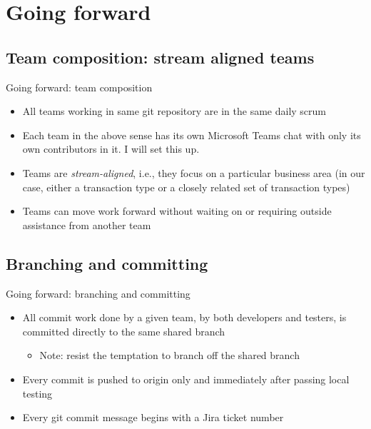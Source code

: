 \documentclass{beamer}
\begin{document}
	\section{Going forward}
	\subsection{Team composition: stream aligned teams}
	\begin{frame}{Going forward: team composition}
		\begin{itemize}
			\item All teams working in same git repository are in the same daily scrum \pause
			\item Each team in the above sense has its own Microsoft Teams chat with only its own contributors in it. I will set this up. \pause
			\item Teams are \textit{stream-aligned}, i.e., they focus on a particular business area (in our case, either a transaction type or a closely related set of transaction types) \pause
			\item Teams can move work forward without waiting on or requiring outside assistance from another team \pause	
		\end{itemize}
	\end{frame}
	\subsection{Branching and committing}
	\begin{frame}{Going forward: branching and committing}
		\begin{itemize}
			\item All commit work done by a given team, by both developers and testers, is committed directly to the same shared branch \pause
			\begin{itemize}
				\item Note: resist the temptation to branch off the shared branch \pause
			\end{itemize}
			\item Every commit is pushed to origin only and immediately after passing local testing \pause
			\item Every git commit message begins with a Jira ticket number \pause
		\end{itemize}
	\end{frame}
\end{document}
